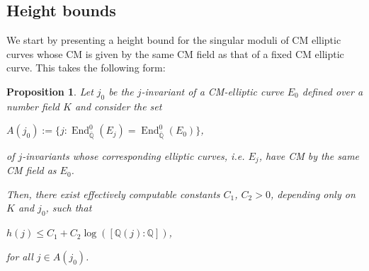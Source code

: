 \documentclass[12pt,twoside,a4paper]{article}
\theoremstyle{plain}%
\newtheorem{prop}[theorem]{Proposition}
\DeclareMathOperator{\End}{End}
\newcommand{\Q}{\mathbb{Q}}
\begin{document}
\subsection{Height bounds}\label{cmheightboundproof}

We start by presenting a height bound for the singular moduli of CM elliptic curves whose CM is given by the same CM field as that of a fixed CM elliptic curve. This takes the following form:
\begin{prop}\label{propisogenouscm}
	Let $j_0$ be the $j$-invariant of a CM-elliptic curve $E_0$ defined over a number field $K$ and consider the set \begin{center}
		$A(j_0):=\{j: \End^{0}_{\bar{\Q}}(E_j)=\End^{0}_{\bar{\Q}}(E_0)\}$,
	\end{center}of $j$-invariants whose corresponding elliptic curves, i.e. $E_j$, have CM by the same CM field as $E_0$.
	
	Then, there exist effectively computable constants $C_1$, $C_2>0$, depending only on $K$ and $j_0$, such that
	\begin{center}
		$h(j)\leq C_1 +C_2\log ([\Q(j):\Q])$, 
	\end{center}for all $j\in A(j_0)$.\end{prop}
\end{document}
